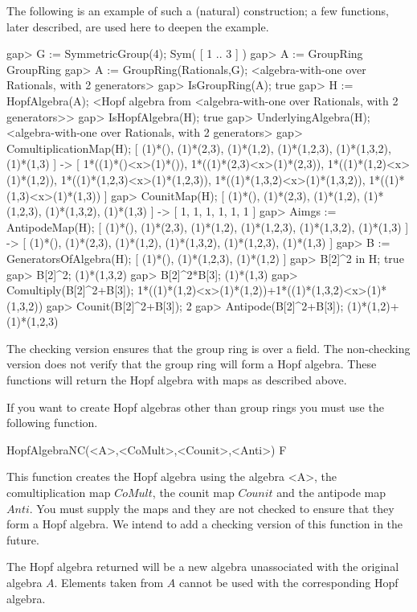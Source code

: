 The following is an example of such a (natural) construction; a few
functions, later described, are used here to deepen the example.

\beginexample
gap> G := SymmetricGroup(4);
Sym( [ 1 .. 3 ] )
gap> A := GroupRing
    GroupRing
gap> A := GroupRing(Rationals,G);
<algebra-with-one over Rationals, with 2 generators>
gap> IsGroupRing(A);
true
gap> H := HopfAlgebra(A);
<Hopf algebra from <algebra-with-one over Rationals, with 2 generators>>
gap> IsHopfAlgebra(H);
true
gap> UnderlyingAlgebra(H);
<algebra-with-one over Rationals, with 2 generators>
gap> ComultiplicationMap(H);     
[ (1)*(), (1)*(2,3), (1)*(1,2), (1)*(1,2,3), (1)*(1,3,2), (1)*(1,3) ] -> 
[ 1*((1)*()<x>(1)*()), 1*((1)*(2,3)<x>(1)*(2,3)), 1*((1)*(1,2)<x>(1)*(1,2)), 
  1*((1)*(1,2,3)<x>(1)*(1,2,3)), 1*((1)*(1,3,2)<x>(1)*(1,3,2)), 1*((1)*(1,3)<x>(1)*(1,3)) ]
gap> CounitMap(H);
[ (1)*(), (1)*(2,3), (1)*(1,2), (1)*(1,2,3), (1)*(1,3,2), (1)*(1,3) ] -> [ 1, 1, 1, 1, 1, 1 ]
gap> Aimgs := AntipodeMap(H);
[ (1)*(), (1)*(2,3), (1)*(1,2), (1)*(1,2,3), (1)*(1,3,2), (1)*(1,3) ] -> 
[ (1)*(), (1)*(2,3), (1)*(1,2), (1)*(1,3,2), (1)*(1,2,3), (1)*(1,3) ]
gap> B := GeneratorsOfAlgebra(H);
[ (1)*(), (1)*(1,2,3), (1)*(1,2) ]
gap> B[2]^2 in H;    
true
gap> B[2]^2;
(1)*(1,3,2)
gap> B[2]^2*B[3];
(1)*(1,3)
gap> Comultiply(B[2]^2+B[3]);
1*((1)*(1,2)<x>(1)*(1,2))+1*((1)*(1,3,2)<x>(1)*(1,3,2))
gap> Counit(B[2]^2+B[3]);    
2
gap> Antipode(B[2]^2+B[3]);
(1)*(1,2)+(1)*(1,2,3)

\endexample

The checking version ensures that the group ring is over a field.
The non-checking version does not verify that the group ring will form a Hopf algebra.
These functions will return the Hopf algebra with maps as described above.


If you want to create Hopf algebras other than group rings you must use the following 
function.  

\>HopfAlgebraNC(<A>,<CoMult>,<Counit>,<Anti>) F

This function creates the Hopf algebra using the 
algebra <A>, the comultiplication map $CoMult$, the counit map $Counit$ and the 
antipode map $Anti$.  You must supply the maps and they are not checked to ensure that they form a Hopf algebra. 
We intend to add a checking version of this function in the future.

The Hopf algebra returned will be a new algebra unassociated with
the original algebra $A$.
Elements taken from $A$ cannot be used with the corresponding Hopf algebra.

